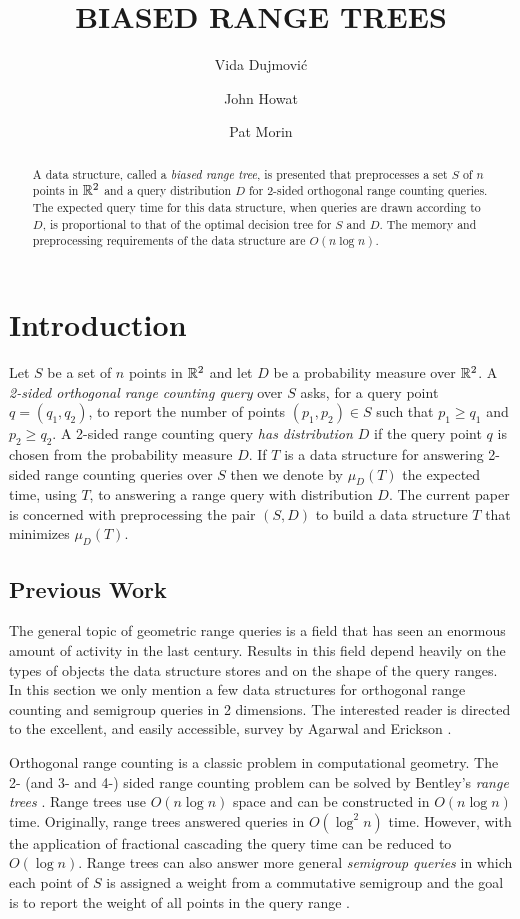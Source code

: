 \documentclass[lotsofwhite,charterfonts]{patmorin}
\title{\MakeUppercase{Biased Range Trees}}
\author{Vida Dujmovi\'c
	\and John Howat
	\and Pat Morin}
\begin{document}
\maketitle
\begin{abstract}
A data structure, called a \emph{biased range tree}, is presented that
preprocesses a set $S$ of $n$ points in $\mathbb{R}^2$ and a query
distribution $D$ for 2-sided orthogonal range counting queries.  The
expected query time for this data structure, when queries are drawn
according to $D$, is proportional to that of the optimal decision tree
for $S$ and $D$.   The memory and preprocessing requirements of the
data structure are $O(n\log n)$.
\end{abstract}

\section{Introduction}

Let $S$ be a set of $n$ points in $\mathbb{R}^2$ and let $D$ be a probability
measure over $\mathbb{R}^2$.  A \emph{2-sided orthogonal range counting query}
over $S$ asks, for a query point $q=(q_1,q_2)$, to report the number
of points $(p_1,p_2)\in S$ such that $p_1 \ge q_1$ and $p_2 \ge q_2$.
A 2-sided range counting query \emph{has distribution $D$} if the
query point $q$ is chosen from the probability measure $D$.  If $T$ is
a data structure for answering 2-sided range counting queries over $S$
then we denote by $\mu_D(T)$ the expected time, using $T$, to
answering a range query with distribution $D$.  The current paper is
concerned with preprocessing the pair $(S,D)$ to build a data
structure $T$ that minimizes $\mu_D(T)$.

\subsection{Previous Work}

The general topic of geometric range queries is a field that has seen
an enormous amount of activity in the last century.  Results in this
field depend heavily on the types of objects the data structure stores
and on the shape of the query ranges.  In this section we only mention
a few data structures for orthogonal range counting and semigroup
queries in 2 dimensions.  The interested reader is directed to the
excellent, and easily accessible, survey by Agarwal and Erickson
\cite{ea99}.

Orthogonal range counting is a classic problem in computational
geometry.  The 2- (and 3- and 4-) sided range counting problem can be
solved by Bentley's \emph{range trees} \cite{ae42}.  Range trees use
$O(n\log n)$ space and can be constructed in $O(n\log n)$ time.
Originally, range trees answered queries in $O(\log^2 n)$ time.
However, with the application of fractional cascading \cite{ae76,ae196} the
query time can be reduced to $O(\log n)$.  Range trees can also answer
more general \emph{semigroup queries} in which each point of $S$ is
assigned a weight from a commutative semigroup and the goal is to
report the weight of all points in the query range \cite{ae133,ae292}.
\end{document}
